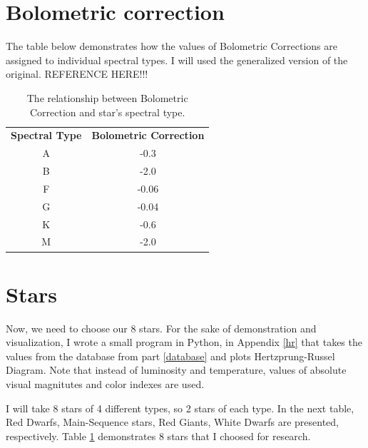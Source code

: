 \documentclass[a4paper,12pt]{article}
\begin{document}
  
  \section{Bolometric correction}
  
  The table below demonstrates how the values of Bolometric Corrections are assigned to individual spectral types. I will used the generalized version of the original. REFERENCE HERE!!!\\
  
  
  \begin{table}[h!]
    \begin{center}
      \centering
      \caption{The relationship between Bolometric Correction and star's spectral type.}
      \begin{tabular}{c | c}
        \textbf{Spectral Type} & \textbf{Bolometric Correction} \\
        A & -0.3\\
        B & -2.0\\
        F & -0.06\\
        G & -0.04\\
        K & -0.6\\
        M & -2.0\\
      \end{tabular}
      \label{stars}
    \end{center}
  \end{table}
  
  \newpage
  \section{Stars}
  
  Now, we need to choose our 8 stars. For the sake of demonstration and visualization, I wrote a small program in Python, in Appendix \ref{hr} that takes the values from the database from part \ref{database} and plots Hertzprung-Russel Diagram. Note that instead of luminosity and temperature, values of absolute visual magnitutes and color indexes are used.
  
  I will take 8 stars of 4 different types, so 2 stars of each type. In the next table, Red Dwarfs, Main-Sequence stars, Red Giants, White Dwarfs are presented, respectively. Table \ref{stars} demonstrates 8 stars that I choosed for research.
  
\end{document}
